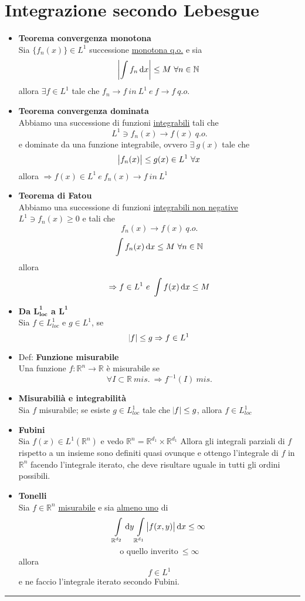 \documentclass[a4paper,portrait,columns=3,5pt]{cheatsheet}
\begin{document}
\section{Integrazione secondo Lebesgue}
\begin{itemize}
    \item \textbf{Teorema convergenza monotona} \\ Sia $\{ f_n(x) \} \in L^1$ successione \underline{monotona q.o.} e sia $$\abs{\int f_n \dif x} \leq M~\forall n \in \mathbb{N}$$ allora $ \exists f \in L^1$ tale che $f_n \rightarrow f~ in~ L^1~e~f\rightarrow f~q.o.$
    \item \textbf{Teorema convergenza dominata}\\ Abbiamo una successione di funzioni \underline{integrabili} tali che $$ L^1 \ni f_n(x) \rightarrow f(x)~q.o.$$ e dominate da una funzione integrabile, ovvero $\exists~g(x)$ tale che $$ \abs{f_n(x)} \leq g(x) \in L^1~\forall x$$ allora $\Rightarrow f(x) \in L^1 ~ e ~ f_n(x) \rightarrow f~in~L^1$
    \item \textbf{Teorema di Fatou}\\ Abbiamo una successione di funzioni \underline{integrabili non negative} $L^1 \ni f_n(x) \geq 0$ e tali che $$f_n(x) \rightarrow f(x)~q.o.$$ $$\int f_n(x) \dif x \leq M~\forall n\in \mathbb{N}$$ allora $$ \Rightarrow f\in L^1~e~\int f(x) \dif x \leq M$$ 
    \item \textbf{Da $\mathbf{L^1_{loc}}$ a $\mathbf{L^1}$}\\Sia $f\in L^1_{loc}$ e $g\in L^1$, se $$\abs{f} \leq g \Rightarrow f\in L^1$$
    \item Def: \textbf{Funzione misurabile} \\ Una funzione $f:\mathbb{R}^n \rightarrow \mathbb{R}$ è misurabile se $$\forall I\subset \mathbb{R}~mis.~ \Rightarrow f^{-1}(I)~mis.$$ 
    \item \textbf{Misurabilià e integrabilità}\\ Sia $f$ misurabile; se esiste $g\in L^1_{loc}$ tale che $\abs{f} \leq g$, allora $f\in L^1_{loc}$
    \item \textbf{Fubini}\\ Sia $f(x) \in L^1(\mathbb{R}^n)$ e vedo $\mathbb{R}^n = \mathbb{R}^{d_1} \times \mathbb{R}^{d_1}$ Allora gli integrali parziali di $f$ rispetto a un insieme sono definiti quasi ovunque e ottengo l'integrale di $f$ in $\mathbb{R}^{n}$ facendo l'integrale iterato, che deve risultare uguale in tutti gli ordini possibili.
    \item \textbf{Tonelli}\\ Sia $f\in \mathbb{R}^n$ \underline{misurabile} e sia \underline{almeno uno} di $$ \int \limits_{\mathbb{R}^{d_2}} \dif y \int \limits_{\mathbb{R}^{d_1}} \abs{f(x, y)} \dif x \leq \infty $$ $$ \text{o quello inverito}~\leq \infty$$ allora $$f\in L^1$$ e ne faccio l'integrale iterato secondo Fubini.
\end{itemize}
\hrule
\end{document}
